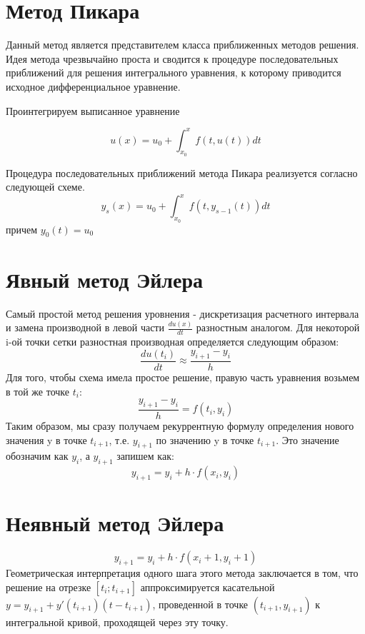 \documentclass[12pt]{report}
\begin{document}
\section{Метод Пикара}
Данный метод является представителем класса приближенных методов решения.
Идея метода чрезвычайно проста и сводится к процедуре последовательных приближений для решения интегрального уравнения, к которому приводится исходное дифференциальное уравнение.

Проинтегрируем выписанное уравнение

\begin{equation}
	u(x) = u_0 + \int_{x_0}^{x} f(t,u(t))dt
\end{equation}

Процедура последовательных приближений метода Пикара реализуется согласно следующей схеме.
\begin{equation}
y_s(x) = u_0 + \int_{x_0}^{x} f(t,y_{s-1}(t))dt
\end{equation}
причем $y_0(t) = u_0$

\section{Явный метод Эйлера}
Самый простой метод решения уровнения - дискретизация расчетного интервала и замена производной в левой части $\frac{du(x)}{dt}$	разностным аналогом. Для некоторой i-ой точки сетки разностная производная определяется следующим образом:
\begin{equation}
\frac{du(t_i)}{dt} \approx \frac{y_{i+1} - y_i}{h}
\end{equation}
Для того, чтобы схема имела простое решение, правую часть уравнения возьмем в той же точке $t_i$:
\begin{equation}
\frac{y_{i+1} - y_i}{h} = f(t_i, y_i)
\end{equation}
Таким образом, мы сразу получаем рекуррентную формулу определения нового значения y в точке $t_{i+1}$, т.е. $y_{i+1}$ по значению y в точке $t_{i+1}$. Это значение обозначим как $y_{i}$, а $y_{i+1}$ запишем как:
\begin{equation}
y_{i+1} = y_i + h \cdot f(x_i,y_i)
\end{equation}
\section{Неявный метод Эйлера}
\begin{equation}
y_{i+1} = y_i + h \cdot f(x_i+1,y_i+1)
\end{equation}
Геометрическая интерпретация  одного шага этого метода заключается в том, что решение на отрезке $[t_i;t_{i+1}]$ аппроксимируется касательной $y = y_{i+1} + y'(t_{i+1})(t-t_{i+1})$, проведенной в точке $(t_{i+1},y_{i+1})$ к интегральной кривой, проходящей через эту точку.
\end{document}
